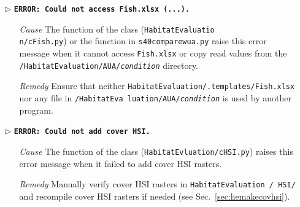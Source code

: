 \begin{itemize}
		\item[$\triangleright$]\textbf{\texttt{ERROR: Could not access Fish.xlsx (...).}}
	\begin{itemize}
		\item[\textit{Cause}\hspace{0.27cm}] The  function of the  class (\texttt{HabitatEvaluatio}\\\texttt{n/cFish.py}) or the  function in \texttt{s40{\myUnderscore}compare{\myUnderscore}wua.py} raise this error message when it cannot access \texttt{Fish.xlsx} or copy read values from the \texttt{/HabitatEvaluation/AUA/\textit{condition}} directory.
		\item[\textit{Remedy}] Ensure that neither \texttt{HabitatEvaluation/.templates/Fish.xlsx} nor any file in \texttt{/HabitatEva luation/AUA/\textit{condition}} is used by another program.\\
	\end{itemize}
	
	\item[$\triangleright$]\textbf{\texttt{ERROR: Could not add cover HSI.}}
	\begin{itemize}
		\item[\textit{Cause}\hspace{0.27cm}] The  function of the  class (\texttt{HabitatEvluation/cHSI.py}) raises this error message when it failed to add cover HSI rasters.
		\item[\textit{Remedy}] Manually verify cover HSI rasters in \texttt{HabitatEvaluation / HSI/} and recompile cover HSI rasters if needed (see Sec.~\ref{sec:hemakecovhsi}).\\
	\end{itemize}		
	

\end{itemize}
